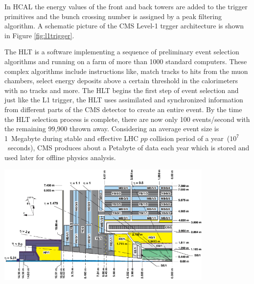 \newline
In HCAL the energy values of the front and back towers are added to the trigger primitives and the bunch crossing  number is assigned by a peak filtering algorithm.  A schematic picture of the CMS  Level-1 trgger architecture is shown in Figure \ref{fig:l1trigger}.
\par
The HLT is a software implementing a sequence of preliminary event selection algorithms and running on a farm of more than 1000 standard computers. These complex algorithms include instructions like, match tracks to hits from the muon chambers, select energy deposits above a certain threshold in the calorimeters with no tracks and more. The HLT begins the first step of event selection and just like the L1 trigger, the HLT  uses assimilated and synchronized information from different parts of the CMS detector to create an entire event. By the time the HLT selection process is complete, there are now only 100 events/second with the remaining 99,900 thrown away.  Considering an average event size is 1~Megabyte during stable and effective LHC $pp$ collision period of a year~($10^{7}$~seconds), CMS produces about a Petabyte of data each year which is stored and used later for offline physics analysis.


\vspace{5mm}
\begin{minipage}{0.99\textwidth} 
\begin{center}\label{CMS-SUBD}
\mbox{\includegraphics[height= 0.6\textwidth, width=0.8\textwidth]{THESISPLOTS/CMS_Int_View.png}} 
\label{fig:cmslview}
\end{center}
\end{minipage}

